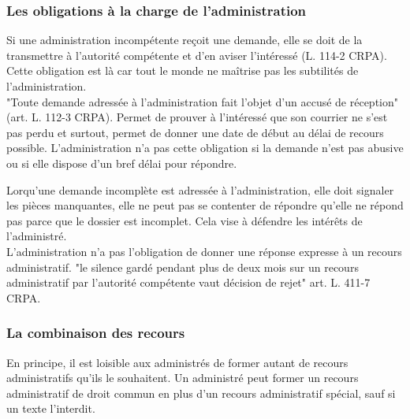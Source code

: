 \documentclass[10pt, a4paper, openany]{book}
\begin{document}
\subsubsection{Les obligations à la charge de l'administration}

Si une administration incompétente reçoit une demande, elle se doit de la transmettre à l'autorité compétente et d'en aviser l'intéressé (L. 114-2 CRPA). Cette obligation est là car tout le monde ne maîtrise pas les subtilités de l'administration. \\
"Toute demande adressée à l'administration fait l'objet d'un accusé de réception" (art. L. 112-3 CRPA). Permet de prouver à l'intéressé que son courrier ne s'est pas perdu et surtout, permet de donner une date de début au délai de recours possible. L'administration n'a pas cette obligation si la demande n'est pas abusive ou si elle dispose d'un bref délai pour répondre. 


Lorqu'une demande incomplète est adressée à l'administration, elle doit signaler les pièces manquantes, elle ne peut pas se contenter de répondre qu'elle ne répond pas parce que le dossier est incomplet. Cela vise à défendre les intérêts de l'administré. \\
L'administration n'a pas l'obligation de donner une réponse expresse à un recours administratif. "le silence gardé pendant plus de deux mois sur un recours administratif par l'autorité compétente vaut décision de rejet" art. L. 411-7 CRPA. 

\subsubsection{La combinaison des recours}

En principe, il est loisible aux administrés de former autant de recours administratifs qu'ils le souhaitent. Un administré peut former un recours administratif de droit commun en plus d'un recours administratif spécial, sauf si un texte l'interdit.
\end{document}
